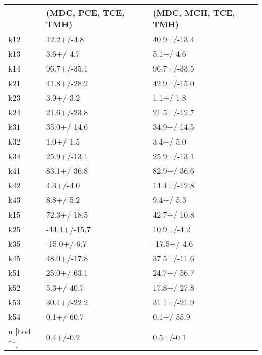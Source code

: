 \begin{tabular}{lll}
\toprule
{} & (MDC, PCE, TCE, TMH) & (MDC, MCH, TCE, TMH) \\
\midrule
k12            &           12.2+/-4.8 &          40.9+/-13.4 \\
k13            &            3.6+/-4.7 &            5.1+/-4.6 \\
k14            &          96.7+/-35.1 &          96.7+/-33.5 \\
k21            &          41.8+/-28.2 &          42.9+/-15.0 \\
k23            &            3.9+/-3.2 &            1.1+/-1.8 \\
k24            &          21.6+/-23.8 &          21.5+/-12.7 \\
k31            &          35.0+/-14.6 &          34.9+/-14.5 \\
k32            &            1.0+/-1.5 &            3.4+/-5.0 \\
k34            &          25.9+/-13.1 &          25.9+/-13.1 \\
k41            &          83.1+/-36.8 &          82.9+/-36.6 \\
k42            &            4.3+/-4.0 &          14.4+/-12.8 \\
k43            &            8.8+/-5.2 &            9.4+/-5.3 \\

k15            &          72.3+/-18.5 &          42.7+/-10.8 \\
k25            &         -44.4+/-15.7 &           10.9+/-4.2 \\
k35            &          -15.0+/-6.7 &          -17.5+/-4.6 \\
k45            &          48.0+/-17.8 &          37.5+/-11.6 \\
k51            &          25.0+/-63.1 &          24.7+/-56.7 \\
k52            &           5.3+/-40.7 &          17.8+/-27.8 \\
k53            &          30.4+/-22.2 &          31.1+/-21.9 \\
k54            &           0.1+/-60.7 &           0.1+/-55.9 \\
n [hod$^{-1}$] &            0.4+/-0.2 &            0.5+/-0.1 \\
\bottomrule
\end{tabular}
